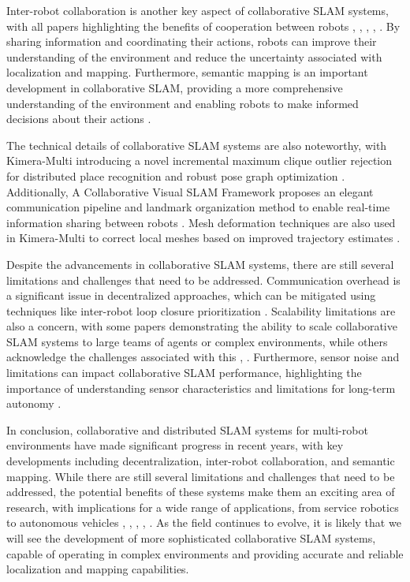 \documentclass[conference]{IEEEtran}
\begin{document}
Inter-robot collaboration is another key aspect of collaborative SLAM systems, with all papers highlighting the benefits of cooperation between robots \cite{b1}, \cite{b2}, \cite{b3}, \cite{b4}, \cite{b5}. By sharing information and coordinating their actions, robots can improve their understanding of the environment and reduce the uncertainty associated with localization and mapping. Furthermore, semantic mapping is an important development in collaborative SLAM, providing a more comprehensive understanding of the environment and enabling robots to make informed decisions about their actions \cite{b4}.

The technical details of collaborative SLAM systems are also noteworthy, with Kimera-Multi introducing a novel incremental maximum clique outlier rejection for distributed place recognition and robust pose graph optimization \cite{b4}. Additionally, A Collaborative Visual SLAM Framework proposes an elegant communication pipeline and landmark organization method to enable real-time information sharing between robots \cite{b3}. Mesh deformation techniques are also used in Kimera-Multi to correct local meshes based on improved trajectory estimates \cite{b4}.

Despite the advancements in collaborative SLAM systems, there are still several limitations and challenges that need to be addressed. Communication overhead is a significant issue in decentralized approaches, which can be mitigated using techniques like inter-robot loop closure prioritization \cite{b2}. Scalability limitations are also a concern, with some papers demonstrating the ability to scale collaborative SLAM systems to large teams of agents or complex environments, while others acknowledge the challenges associated with this \cite{b1}, \cite{b5}. Furthermore, sensor noise and limitations can impact collaborative SLAM performance, highlighting the importance of understanding sensor characteristics and limitations for long-term autonomy \cite{b6}.

In conclusion, collaborative and distributed SLAM systems for multi-robot environments have made significant progress in recent years, with key developments including decentralization, inter-robot collaboration, and semantic mapping. While there are still several limitations and challenges that need to be addressed, the potential benefits of these systems make them an exciting area of research, with implications for a wide range of applications, from service robotics to autonomous vehicles \cite{b1}, \cite{b2}, \cite{b3}, \cite{b4}, \cite{b5}. As the field continues to evolve, it is likely that we will see the development of more sophisticated collaborative SLAM systems, capable of operating in complex environments and providing accurate and reliable localization and mapping capabilities.
\end{document}
